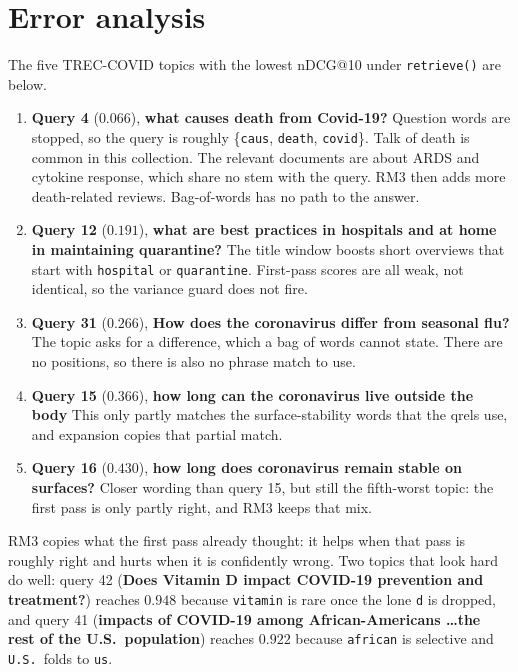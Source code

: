 \documentclass[10pt,a4paper]{article}
\begin{document}
\section{Error analysis}
The five TREC-COVID topics with the lowest nDCG@10 under \texttt{retrieve()} are
below.
\begin{enumerate}[itemsep=3pt,parsep=2pt]
  \item \textbf{Query 4} ($0.066$), \textbf{what causes death from Covid-19?}
        Question words are stopped, so the query is roughly
        \{\texttt{caus}, \texttt{death}, \texttt{covid}\}. Talk of death is
        common in this collection. The relevant documents are about ARDS and
        cytokine response, which share no stem with the query. RM3 then adds
        more death-related reviews. Bag-of-words has no path to the answer.
  \item \textbf{Query 12} ($0.191$), \textbf{what are best practices in hospitals
        and at home in maintaining quarantine?}
        The title window boosts short overviews that start with
        \texttt{hospital} or \texttt{quarantine}. First-pass scores are all
        weak, not identical, so the variance guard does not fire.
  \item \textbf{Query 31} ($0.266$), \textbf{How does the coronavirus differ from
        seasonal flu?}
        The topic asks for a difference, which a bag of words cannot state.
        There are no positions, so there is also no phrase match to use.
  \item \textbf{Query 15} ($0.366$), \textbf{how long can the coronavirus live
        outside the body}
        This only partly matches the surface-stability words that the qrels
        use, and expansion copies that partial match.
  \item \textbf{Query 16} ($0.430$), \textbf{how long does coronavirus remain
        stable on surfaces?}
        Closer wording than query 15, but still the fifth-worst topic: the
        first pass is only partly right, and RM3 keeps that mix.
\end{enumerate}
RM3 copies what the first pass already thought: it helps when that pass is
roughly right and hurts when it is confidently wrong. Two topics that look
hard do well: query 42 (\textbf{Does Vitamin D impact COVID-19 prevention and
treatment?}) reaches $0.948$ because \texttt{vitamin} is rare once the lone
\texttt{d} is dropped, and query 41 (\textbf{impacts of COVID-19 among
African-Americans \ldots the rest of the U.S.\ population}) reaches $0.922$
because \texttt{african} is selective and \texttt{U.S.}\ folds to \texttt{us}.
\end{document}
